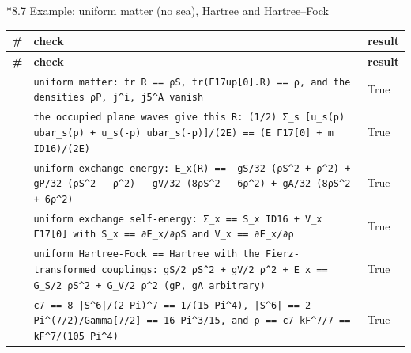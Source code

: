 \documentclass[10pt,a4paper]{article}
\makeatletter
\renewcommand\subsubsection{\@startsection{subsubsection}{3}{\z@}{-3.25ex\@plus -1ex \@minus -.2ex}{1.5ex \@plus .2ex}{\normalfont\normalsize\bfseries\raggedright}}
\makeatother
\begin{document}
\subsubsection*{8.7 Example: uniform matter (no sea), Hartree and Hartree–Fock}
{\footnotesize
\begin{longtable}{>{\raggedright\arraybackslash}p{}>{\raggedright\arraybackslash}p{}>{\raggedright\arraybackslash}p{}}
\toprule
\textbf{\#} & \textbf{check} & \textbf{result} \\
\midrule\endfirsthead
\toprule
\textbf{\#} & \textbf{check} & \textbf{result} \\
\midrule\endhead
\endfoot
\bottomrule\endlastfoot
176 & \texttt{uniform matter: tr R == ρS, tr(Γ17up[0].R) == ρ, and the densities ρP, j\textasciicircum{}i, j5\textasciicircum{}A vanish} & True \\
177 & \texttt{the occupied plane waves give this R: (1/\allowbreak{}2) Σ\_\allowbreak{}s [u\_\allowbreak{}s(p) ubar\_\allowbreak{}s(p) + u\_\allowbreak{}s(-p) ubar\_\allowbreak{}s(-p)]/\allowbreak{}(2E) == (E Γ17[0] + m ID16)/\allowbreak{}(2E)} & True \\
178 & \texttt{uniform exchange energy: E\_\allowbreak{}x(R) == -gS/\allowbreak{}32 (ρS\textasciicircum{}2 + ρ\textasciicircum{}2) + gP/\allowbreak{}32 (ρS\textasciicircum{}2 - ρ\textasciicircum{}2) - gV/\allowbreak{}32 (8ρS\textasciicircum{}2 - 6ρ\textasciicircum{}2) + gA/\allowbreak{}32 (8ρS\textasciicircum{}2 + 6ρ\textasciicircum{}2)} & True \\
179 & \texttt{uniform exchange self-energy: Σ\_\allowbreak{}x == S\_\allowbreak{}x ID16 + V\_\allowbreak{}x Γ17[0] with S\_\allowbreak{}x == ∂E\_\allowbreak{}x/\allowbreak{}∂ρS and V\_\allowbreak{}x == ∂E\_\allowbreak{}x/\allowbreak{}∂ρ} & True \\
180 & \texttt{uniform Hartree-Fock == Hartree with the Fierz-transformed couplings: gS/\allowbreak{}2 ρS\textasciicircum{}2 + gV/\allowbreak{}2 ρ\textasciicircum{}2 + E\_\allowbreak{}x == G\_\allowbreak{}S/\allowbreak{}2 ρS\textasciicircum{}2 + G\_\allowbreak{}V/\allowbreak{}2 ρ\textasciicircum{}2 (gP, gA arbitrary)} & True \\
181 & \texttt{c7 == 8 |S\textasciicircum{}6|/\allowbreak{}(2 Pi)\textasciicircum{}7 == 1/\allowbreak{}(15 Pi\textasciicircum{}4), |S\textasciicircum{}6| == 2 Pi\textasciicircum{}(7/\allowbreak{}2)/\allowbreak{}Gamma[7/\allowbreak{}2] == 16 Pi\textasciicircum{}3/\allowbreak{}15, and ρ == c7 kF\textasciicircum{}7/\allowbreak{}7 == kF\textasciicircum{}7/\allowbreak{}(105 Pi\textasciicircum{}4)} & True \\

\end{longtable}}
\end{document}
